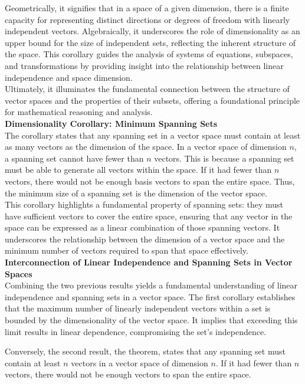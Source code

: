 Geometrically, it signifies that in a space of a given dimension, there is a finite capacity for representing distinct directions or degrees of freedom with linearly independent vectors. Algebraically, it underscores the role of dimensionality as an upper bound for the size of independent sets, reflecting the inherent structure of the space. This corollary guides the analysis of systems of equations, subspaces, and transformations by providing insight into the relationship between linear independence and space dimension. 
\\

Ultimately, it illuminates the fundamental connection between the structure of vector spaces and the properties of their subsets, offering a foundational principle for mathematical reasoning and analysis.
\\

\textbf{Dimensionality Corollary: Minimum Spanning Sets}\\
The corollary states that any spanning set in a vector space must contain at least as many vectors as the dimension of the space. In a vector space of dimension $n$, a spanning set cannot have fewer than $n$ vectors. This is because a spanning set must be able to generate all vectors within the space. If it had fewer than $n$ vectors, there would not be enough basis vectors to span the entire space. Thus, the minimum size of a spanning set is the dimension of the vector space. 
\\

This corollary highlights a fundamental property of spanning sets: they must have sufficient vectors to cover the entire space, ensuring that any vector in the space can be expressed as a linear combination of those spanning vectors. It underscores the relationship between the dimension of a vector space and the minimum number of vectors required to span that space effectively.
\\

\textbf{Interconnection of Linear Independence and Spanning Sets in Vector Spaces}\\
Combining the two previous results yields a fundamental understanding of linear independence and spanning sets in a vector space. The first corollary establishes that the maximum number of linearly independent vectors within a set is bounded by the dimensionality of the vector space. It implies that exceeding this limit results in linear dependence, compromising the set's independence. 

Conversely, the second result, the theorem, states that any spanning set must contain at least $n$ vectors in a vector space of dimension $n$. If it had fewer than $n$ vectors, there would not be enough vectors to span the entire space.

